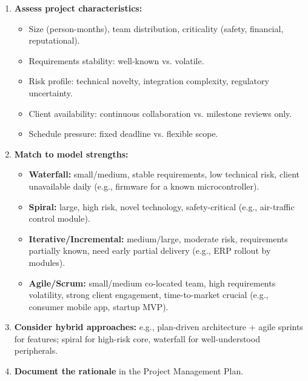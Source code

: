 \documentclass[11pt]{article}
\begin{document}
\begin{methode}
\begin{enumerate}
\item \textbf{Assess project characteristics:}
\begin{itemize}
\item Size (person-months), team distribution, criticality (safety, financial, reputational).
\item Requirements stability: well-known vs. volatile.
\item Risk profile: technical novelty, integration complexity, regulatory uncertainty.
\item Client availability: continuous collaboration vs. milestone reviews only.
\item Schedule pressure: fixed deadline vs. flexible scope.
\end{itemize}
\item \textbf{Match to model strengths:}
\begin{itemize}
\item \textbf{Waterfall:} small/medium, stable requirements, low technical risk, client unavailable daily (e.g., firmware for a known microcontroller).
\item \textbf{Spiral:} large, high risk, novel technology, safety-critical (e.g., air-traffic control module).
\item \textbf{Iterative/Incremental:} medium/large, moderate risk, requirements partially known, need early partial delivery (e.g., ERP rollout by modules).
\item \textbf{Agile/Scrum:} small/medium co-located team, high requirements volatility, strong client engagement, time-to-market crucial (e.g., consumer mobile app, startup MVP).
\end{itemize}
\item \textbf{Consider hybrid approaches:} e.g., plan-driven architecture + agile sprints for features; spiral for high-risk core, waterfall for well-understood peripherals.
\item \textbf{Document the rationale} in the Project Management Plan.
\end{enumerate}
\end{methode}
\end{document}
